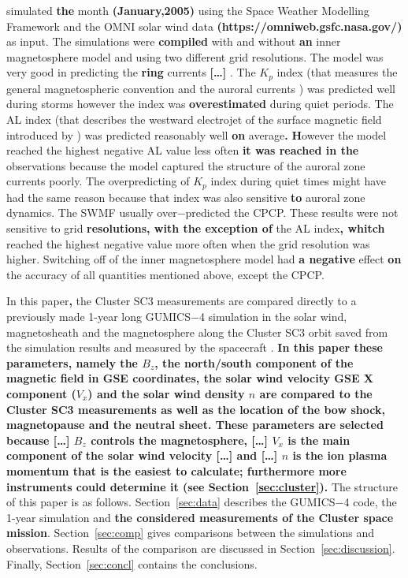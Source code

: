 \documentclass[linenumbers,draft]{agujournal}
\begin{document}
\citet{haiducek17:_swmf_global_magnet_simul_januar} simulated \textbf{the} month \textbf{(January,2005)} using the Space Weather Modelling Framework \citep[SWMF;][]{toth05:_space_weath_model_framew} and the OMNI solar wind data \textbf{(https://omniweb.gsfc.nasa.gov/)} as input. The simulations were \textbf{compiled} with and without \textbf{an} inner magnetosphere model and using two different grid resolutions. The model was very good in predicting the \textbf{ring} currents \textbf{[\dots]} \citep[SYM-H; http://wdc.kugi.kyoto-u.ac.jp/aeasy/asy.pdf;][]{iyemori90:_storm}. The $K_p$ index (that measures the general magnetospheric convention and the auroral currents \citep{bartels39,rostoker72:_geomag,thomsen04:_why_kp}) was predicted well during storms however the index was \textbf{overestimated} during quiet periods. The AL index (that describes the westward electrojet of the surface magnetic field introduced by \citet{davis66:_auror_ae}) was predicted reasonably well \textbf{on} average\textbf{.} \textbf{H}owever the model reached the highest negative AL value less often \textbf{it was reached in the} observations because the model captured the structure of the auroral zone currents poorly. The overpredicting of $K_p$ index during quiet times might have had the same reason because that index was also sensitive \textbf{to} auroral zone dynamics. The SWMF usually over$-$predicted the CPCP. These results were not sensitive to grid \textbf{resolutions, with the exception of} the AL index\textbf{, whitch} reached the highest negative value more often when the grid resolution was higher. Switching off of the inner magnetosphere model had \textbf{a negative} effect \textbf{on} the accuracy of all quantities mentioned above, except the CPCP. 

In this paper\textbf{,} the Cluster SC3 measurements are compared directly to a previously made 1-year long GUMICS$-$4 simulation in the solar wind, magnetosheath and the magnetosphere along the Cluster SC3 orbit saved from the simulation results and measured by the spacecraft \citep{facsko16:_one_earth}. \textbf{In this paper these parameters, namely the $B_z$\textbf{, the north/south component of the} magnetic field \textbf{in} GSE \textbf{coordinates}, the solar wind velocity GSE X component ($V_x$) and the solar wind density $n$ are compared to the Cluster SC3 measurement\textbf{s} as well as the location of the bow shock, magnetopause and the neutral sheet. These parameters are selected because \textbf{[\dots]} $B_z$ controls the magnetosphere, \textbf{[\dots]} $V_x$ is the main \textbf{component of the} solar wind velocity \textbf{[\dots]} and \textbf{[\dots]} $n$ is the ion plasma momentum that is the easiest to calculate; furthermore more instruments could determine it (see Section~\ref{sec:cluster}).}  The structure of this paper is as follows. Section~\ref{sec:data} describes the GUMICS$-$4 code, the 1-year simulation and \textbf{the considered measurements of the Cluster space mission}. Section~\ref{sec:comp} gives comparisons between the simulations and observations. Results of the comparison are discussed in Section~\ref{sec:discussion}. Finally, Section~\ref{sec:concl} contains the conclusions.
\end{document}
